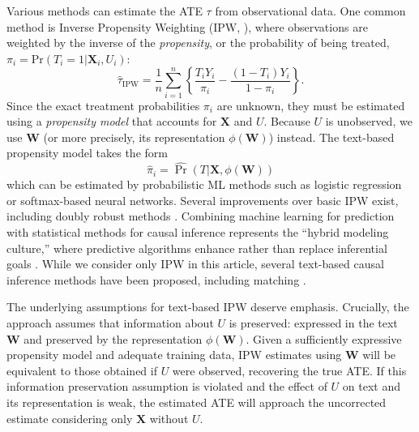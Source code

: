 \documentclass[11pt]{article}
\newcommand{\bX}{\bm{X}} %
\newcommand{\bW}{\bm{W}}  %
\begin{document}
Various methods can estimate the ATE $\tau$ from observational data.
%
One common method is Inverse Propensity Weighting (IPW, \citealt{rosenbaum1983}), where observations are weighted by the inverse of the \emph{propensity}, or the probability of being treated, $\pi_i={\textrm{Pr}}(T_i=1|\bX_i, U_i)$:
\[\widehat{\tau}_{\mathrm{IPW}} =  \frac{1}{n}\sum_{i=1}^n \left\{ \frac{T_i Y_i}{\pi_i} -\frac{(1-T_i)Y_i}{1-\pi_i}\right\}.\]
Since the exact treatment probabilities $\pi_i$ are unknown, they must be estimated using a \emph{propensity model} that accounts for $\bX$ and $U$. Because $U$ is unobserved, we use $\bW$ (or more precisely, its representation $\phi(\bW)$) instead. The text-based propensity model takes the form
\[
\hat{\pi}_i = \widehat{\Pr}(T|\bX, \phi(\bW))
\]
which can be estimated by probabilistic ML methods such as logistic regression or softmax-based neural networks. Several improvements over basic IPW exist, including doubly robust methods \citep{funk2011doubly}. Combining machine learning for prediction with statistical methods for causal inference represents the ``hybrid modeling culture,'' where predictive algorithms enhance rather than replace inferential goals \citep{daoudDubhashiThreeCultures2023,daoudMeltingPredictionInference2021}.
While we consider only IPW in this article, several text-based causal inference methods have been proposed, including matching \citep{mozer2020}.

The underlying assumptions for text-based IPW deserve emphasis. Crucially, the approach assumes that information about $U$ is preserved: expressed in the text $\bW$ and preserved by the representation $\phi(\bW)$. Given a sufficiently expressive propensity model and adequate training data, IPW estimates using $\bW$ will be equivalent to those obtained if $U$ were observed, recovering the true ATE. %
If this information preservation assumption is violated and the effect of $U$ on text and its representation is weak, the estimated ATE will approach the uncorrected estimate considering only $\bX$ without $U$.

\end{document}
